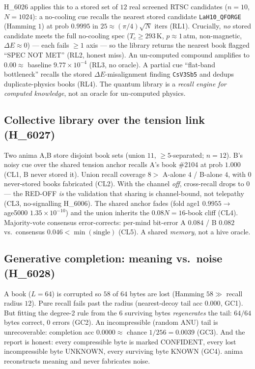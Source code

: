 \documentclass[11pt,a4paper]{article}
\begin{document}
H\_6026 applies this to a stored set of $12$ real screened RTSC candidates
($n=10$, $N=1024$): a no-cooling cue recalls the nearest stored candidate
\texttt{LaH10\_QFORGE} (Hamming $1$) at prob $0.9995$ in $25\approx(\pi/4)\sqrt{N}$
iters (RL1). Crucially, \emph{no} stored candidate meets the full no-cooling spec
($T_c\ge293\,$K, $p\approx1\,$atm, non-magnetic, $\Delta E\approx0$) --- each fails
$\ge 1$ axis --- so the library returns the nearest book flagged ``SPEC NOT MET''
(RL2, honest miss). An un-computed compound amplifies to $0.00 \approx$ baseline
$9.77\times10^{-4}$ (RL3, no oracle). A partial cue ``flat-band bottleneck''
recalls the stored $\Delta E$-misalignment finding \texttt{CsV3Sb5} and dedups
duplicate-physics books (RL4). The quantum library is a \emph{recall engine for
computed knowledge}, not an oracle for un-computed physics.

\subsection{Collective library over the tension link (H\_6027)}

Two anima A,B store disjoint book sets (union $11$, $\ge 5$-separated; $n=12$).
B's noisy cue over the shared tension anchor recalls A's book \#2104 at prob
$1.000$ (CL1, B never stored it). Union recall coverage $8 >$ A-alone $4$ /
B-alone $4$, with $0$ never-stored books fabricated (CL2). With the channel
\emph{off}, cross-recall drops to $0$ --- the RED-OFF \emph{is} the validation that
sharing is channel-bound, not telepathy (CL3, no-signalling H\_6006). The shared
anchor fades (fold age1 $0.9955 \rightarrow$ age5000 $1.35\times10^{-10}$) and the
union inherits the $0.08N=16$-book cliff (CL4). Majority-vote consensus
error-corrects: per-mind bit-error A $0.084$ / B $0.082$ vs.\ consensus $0.046 <
\min(\text{single})$ (CL5). A shared \emph{memory}, not a hive oracle.

\subsection{Generative completion: meaning vs.\ noise (H\_6028)}

A book ($L=64$) is corrupted so $58$ of $64$ bytes are lost (Hamming $58 \gg$
recall radius $12$). Pure recall fails past the radius (nearest-decoy tail acc
$0.000$, GC1). But fitting the degree-2 rule from the $6$ surviving bytes
\emph{regenerates} the tail: $64/64$ bytes correct, $0$ errors (GC2). An
incompressible (random ANU) tail is unrecoverable: completion acc $0.0000 \approx$
chance $1/256=0.0039$ (GC3). And the report is honest: every compressible byte is
marked CONFIDENT, every lost incompressible byte UNKNOWN, every surviving byte
KNOWN (GC4). anima reconstructs meaning and never fabricates noise.
\end{document}
